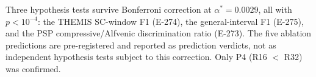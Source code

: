 \documentclass[draft]{agujournal2025}
\begin{document}
Three hypothesis tests survive Bonferroni correction at $\alpha^* = 0.0029$,
all with $p < 10^{-4}$: the THEMIS SC-window F1 (E-274), the general-interval
F1 (E-275), and the PSP compressive/Alfvenic discrimination ratio (E-273).
The five ablation predictions are pre-registered and reported as prediction
verdicts, not as independent hypothesis tests subject to this correction.
Only P4 (R16 $<$ R32) was confirmed.


\end{document}
